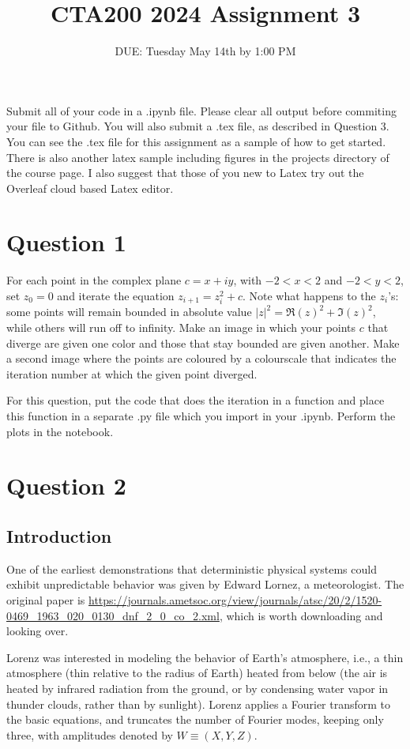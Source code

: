 \documentclass{article}
\title{CTA200 2024 Assignment 3}
\author{DUE: Tuesday May 14th by 1:00 PM}
\date{}
\begin{document}
\maketitle

Submit all of your code in a .ipynb file. Please clear all output before commiting your file to Github. You will also submit a .tex file, as described in Question 3. You can see the .tex file for this assignment as a sample of how to get started. There is also another latex sample including figures in the projects directory of the course page. I also suggest that those of you new to Latex try out the Overleaf cloud based Latex editor.

\section*{Question 1}

For each point in the complex plane $c = x + iy$, with $-2 < x < 2$ and $-2 < y < 2$, set $z_0 = 0$ and iterate the equation $z_{i + 1} = z_i^2 + c$. 
Note what happens to the $z_i$'s: some points will remain bounded in absolute value $|z|^2 = \Re(z)^2 + \Im(z)^2$, while others will run off to infinity. 
Make an image  in which your points $c$ that diverge are given one color and those that stay bounded are given another.
Make a second image where the points are coloured by a colourscale that indicates the iteration number at which the given point diverged.

For this question, put the code that does the iteration in a function and place this function in a separate .py file which you import in your .ipynb.
Perform the plots in the notebook.

\section*{Question 2}

\subsection*{Introduction}
One of the earliest demonstrations that deterministic physical systems could exhibit unpredictable behavior was given by Edward Lornez, a meteorologist. The original paper is \url{https://journals.ametsoc.org/view/journals/atsc/20/2/1520-0469_1963_020_0130_dnf_2_0_co_2.xml}, which is worth downloading and looking over.

Lorenz was interested in modeling the behavior of Earth's atmosphere, i.e., a thin atmosphere (thin relative to the radius of Earth) heated from below (the air is heated by infrared radiation from the ground, or by condensing water vapor in thunder clouds, rather than by sunlight). Lorenz applies a Fourier transform to the basic equations, and truncates the number of Fourier modes, keeping only three, with amplitudes denoted by $W\equiv(X, Y, Z)$.
\end{document}
